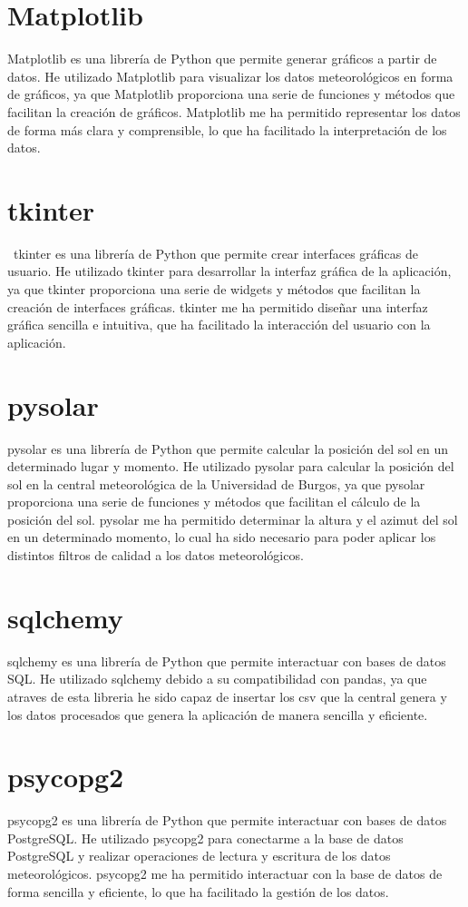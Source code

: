 \section{Matplotlib}
Matplotlib es una librería de Python que permite generar gráficos a partir de datos. He utilizado Matplotlib para visualizar los datos meteorológicos en forma de gráficos, ya que Matplotlib proporciona una serie de funciones y métodos que facilitan la creación de gráficos. Matplotlib me ha permitido representar los datos de forma más clara y comprensible, lo que ha facilitado la interpretación de los datos.\newline
\section{tkinter}\
tkinter es una librería de Python que permite crear interfaces gráficas de usuario. He utilizado tkinter para desarrollar la interfaz gráfica de la aplicación, ya que tkinter proporciona una serie de widgets y métodos que facilitan la creación de interfaces gráficas. tkinter me ha permitido diseñar una interfaz gráfica sencilla e intuitiva, que ha facilitado la interacción del usuario con la aplicación.\newline
\section{pysolar}
pysolar es una librería de Python que permite calcular la posición del sol en un determinado lugar y momento. He utilizado pysolar para calcular la posición del sol en la central meteorológica de la Universidad de Burgos, ya que pysolar proporciona una serie de funciones y métodos que facilitan el cálculo de la posición del sol. pysolar me ha permitido determinar la altura y el azimut del sol en un determinado momento, lo cual ha sido necesario para poder aplicar los distintos filtros de calidad a los datos meteorológicos.\newline
\section{sqlchemy}
sqlchemy es una librería de Python que permite interactuar con bases de datos SQL. He utilizado sqlchemy debido a su compatibilidad con pandas, ya que atraves de esta libreria he sido capaz de insertar los csv que la central genera y los datos procesados que genera la aplicación de manera sencilla y eficiente.\newline
\section{psycopg2}
psycopg2 es una librería de Python que permite interactuar con bases de datos PostgreSQL. He utilizado psycopg2 para conectarme a la base de datos PostgreSQL y realizar operaciones de lectura y escritura de los datos meteorológicos. psycopg2 me ha permitido interactuar con la base de datos de forma sencilla y eficiente, lo que ha facilitado la gestión de los datos.\newline
